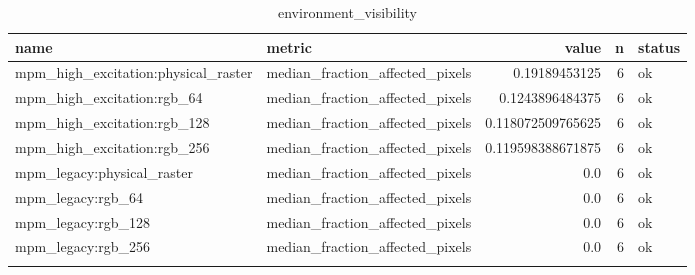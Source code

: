 \begin{table}
\centering
\begin{tabular}{llrrl}
name & metric & value & n & status \\
\hline
mpm\_high\_excitation:physical\_raster & median\_fraction\_affected\_pixels & 0.19189453125 & 6 & ok \\
mpm\_high\_excitation:rgb\_64 & median\_fraction\_affected\_pixels & 0.1243896484375 & 6 & ok \\
mpm\_high\_excitation:rgb\_128 & median\_fraction\_affected\_pixels & 0.118072509765625 & 6 & ok \\
mpm\_high\_excitation:rgb\_256 & median\_fraction\_affected\_pixels & 0.119598388671875 & 6 & ok \\
mpm\_legacy:physical\_raster & median\_fraction\_affected\_pixels & 0.0 & 6 & ok \\
mpm\_legacy:rgb\_64 & median\_fraction\_affected\_pixels & 0.0 & 6 & ok \\
mpm\_legacy:rgb\_128 & median\_fraction\_affected\_pixels & 0.0 & 6 & ok \\
mpm\_legacy:rgb\_256 & median\_fraction\_affected\_pixels & 0.0 & 6 & ok \\
\caption{environment\_visibility}
\end{tabular}
\end{table}
